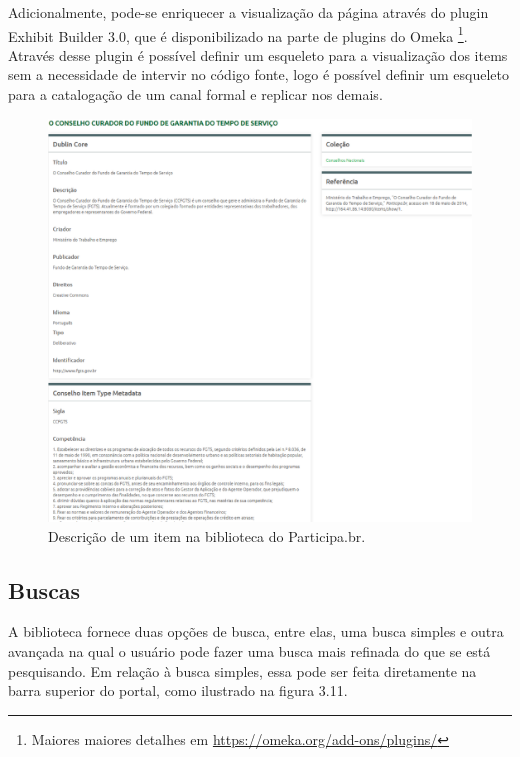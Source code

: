 Adicionalmente, pode-se enriquecer a visualização da página através do plugin Exhibit Builder 3.0, que é disponibilizado na parte de plugins do Omeka \footnote{Maiores maiores detalhes em \url{https://omeka.org/add-ons/plugins/}}. Através desse plugin é possível definir um esqueleto para a visualização dos items sem a necessidade de intervir no código fonte, logo é possível definir um esqueleto para a catalogação de um canal formal e replicar nos demais.

\graphicspath{{figuras/prototipo/}}
\begin{figure}[H]
\centering
\includegraphics[width=1.0\textwidth]{descricao-item}
\caption{Descrição de um item na biblioteca do Participa.br.}
\label{fig:descricao_prototipo}
\end{figure}

\subsection*{Buscas}

A biblioteca fornece duas opções de busca, entre elas, uma busca simples e outra avançada na qual o usuário pode fazer uma busca mais refinada do que se está pesquisando.
Em relação à busca simples, essa pode ser feita diretamente na barra superior do portal, como ilustrado na figura 3.11.

